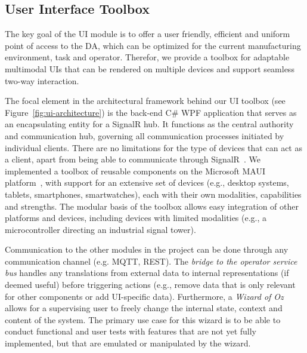 \subsection{User Interface Toolbox}\label{sec:UI}
The key goal of the UI module is to offer a user friendly, efficient and uniform point of access to the DA, which can be optimized for the current manufacturing environment, task and operator. Therefor, we provide a toolbox for adaptable multimodal UIs that can be rendered on multiple devices and support seamless two-way interaction.

The focal element in the architectural framework behind our UI toolbox (see Figure~\ref{fig:ui-architecture}) is the back-end C\# WPF application that serves as an encapsulating entity for a SignalR hub. It functions as the central authority and communication hub, governing all communication processes initiated by individual clients. There are no limitations for the type of devices that can act as a client, apart from being able to communicate through SignalR~\cite{SignalR01,Sharma_2023}. We implemented a toolbox of reusable components on the Microsoft MAUI platform~\cite{Maui01,Maui02}, with support for an extensive set of devices (e.g., desktop systems, tablets, smartphones, smartwatches), each with their own modalities, capabilities and strengths. The modular basis of the toolbox allows easy integration of other platforms and devices, including devices with limited modalities (e.g., a microcontroller directing an industrial signal tower).

Communication to the other modules in the project can be done through any communication channel (e.g. MQTT, REST). The \emph{bridge to the operator service bus} handles any translations from external data to internal representations (if deemed useful) before triggering actions (e.g., remove data that is only relevant for other components or add UI-specific data). Furthermore, a \emph{Wizard of Oz} allows for a supervising user to freely change the internal state, context and content of the system. The primary use case for this wizard is to be able to conduct functional and user tests with features that are not yet fully implemented, but that are emulated or manipulated by the wizard.

